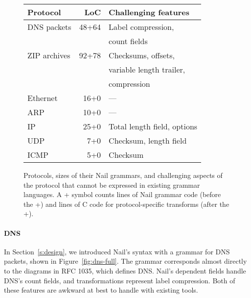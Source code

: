 \begin{figure}[tb]
\centering
\begin{tabular}{lrl}
\toprule
\textbf{Protocol} & \textbf{LoC} & \textbf{Challenging features} \\ 
\midrule
DNS packets & 48+64 & Label compression,\\
  & & count fields \\
ZIP archives & 92+78 & Checksums, offsets, \\ 
  & & variable length trailer, \\
  & & compression \\
Ethernet  & 16+0\phantom{0} & --- \\
ARP       & 10+0\phantom{0} & --- \\
IP        & 25+0\phantom{0} & Total length field, options \\
UDP       &  7+0\phantom{0} & Checksum, length field \\
ICMP      &  5+0\phantom{0} & Checksum \\
\bottomrule
\end{tabular}

\caption{Protocols, sizes of their Nail grammars, and challenging aspects
of the protocol that cannot be expressed in existing grammar languages.
A + symbol counts lines of Nail grammar code (before the +) and lines of
C code for protocol-specific transforms (after the +).}
\label{fig:eval-protocols}
\end{figure}

\paragraph{DNS} In Section~\ref{s:design}, we introduced Nail's syntax with a grammar
for DNS packets, shown in Figure~\ref{fig:dns-full}.
The grammar corresponds almost directly to the diagrams in RFC 1035,
which defines DNS. Nail's dependent fields handle DNS's count fields, and
transformations represent label compression. Both of these features are awkward at best to handle
with existing tools.


